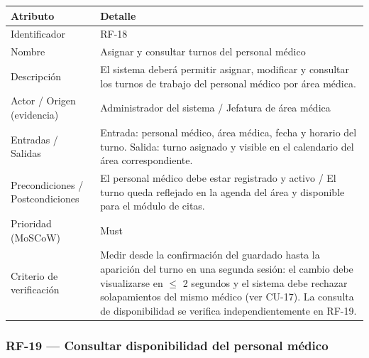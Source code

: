 \documentclass[11pt,a4paper]{article}
\begin{document}
	\begin{longtable}{p{} p{}}
		
		\toprule
		\textbf{Atributo} & \textbf{Detalle} \\
		\midrule
		\endhead
		
		Identificador & RF-18 \\
		Nombre & Asignar y consultar turnos del personal médico \\
		Descripción & El sistema deberá permitir asignar, modificar y consultar los turnos de trabajo del personal médico por área médica. \\
		Actor / Origen (evidencia) & Administrador del sistema / Jefatura de área médica \\
		Entradas / Salidas & Entrada: personal médico, área médica, fecha y horario del turno. Salida: turno asignado y visible en el calendario del área correspondiente. \\
		Precondiciones / Postcondiciones & El personal médico debe estar registrado y activo / El turno queda reflejado en la agenda del área y disponible para el módulo de citas. \\
		Prioridad (MoSCoW) & Must \\
		Criterio de verificación & Medir desde la confirmación del guardado hasta la aparición del turno en una segunda sesión: el cambio debe visualizarse en \(\leq\) 2 segundos y el sistema debe rechazar solapamientos del mismo médico (ver CU-17). La consulta de disponibilidad se verifica independientemente en RF-19. \\
		\bottomrule
	\end{longtable}
	
	\subsubsection{RF-19 --- Consultar disponibilidad del personal médico}
	
\end{document}
